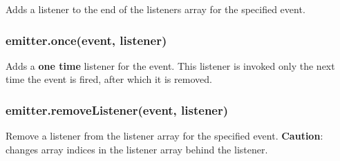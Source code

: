 Adds a listener to the end of the listeners array for the specified
event.

\begin{Shaded}
\begin{Highlighting}[]
\NormalTok{(}\NormalTok{, } 
  \NormalTok{(}\NormalTok{);}
\NormalTok{\});}
\end{Highlighting}
\end{Shaded}

\subsubsection{emitter.once(event, listener)}

Adds a \textbf{one time} listener for the event. This listener is
invoked only the next time the event is fired, after which it is
removed.

\begin{Shaded}
\begin{Highlighting}[]
\NormalTok{(}\NormalTok{, } 
  \NormalTok{(}\NormalTok{);}
\NormalTok{\});}
\end{Highlighting}
\end{Shaded}

\subsubsection{emitter.removeListener(event, listener)}

Remove a listener from the listener array for the specified event.
\textbf{Caution}: changes array indices in the listener array behind the
listener.

\begin{Shaded}
\begin{Highlighting}[]
 
  \NormalTok{(}\NormalTok{);}
\NormalTok{\};}
\NormalTok{(}
\NormalTok{(}
\end{Highlighting}
\end{Shaded}

